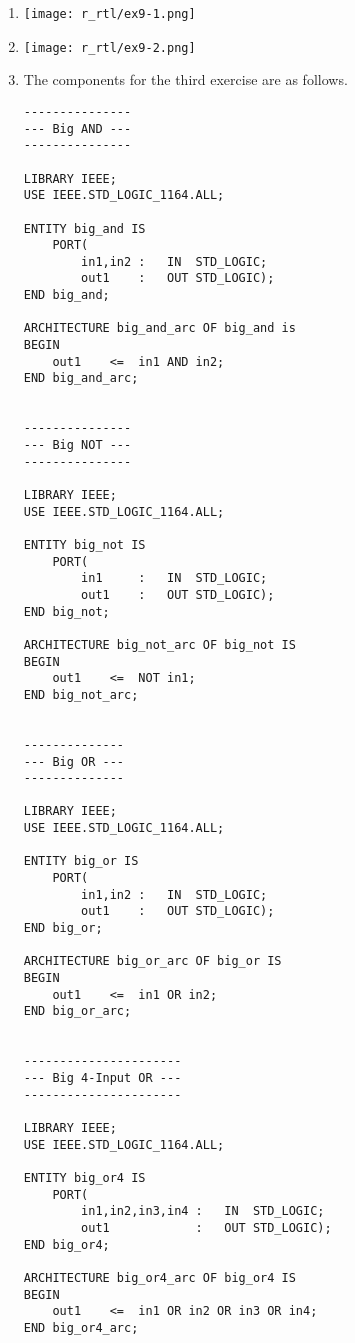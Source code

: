 \begin{enumerate}
	\item
	\begin{minipage}[t]{1\linewidth}
		\vspace{0pt}\raggedright
		\centering
		\texttt{[image: r\_rtl/ex9-1.png]}
	\end{minipage}

\item
\begin{minipage}[t]{1\linewidth}
	\vspace{0pt}\raggedright
	\centering
	\texttt{[image: r\_rtl/ex9-2.png]}
\end{minipage}
\item The components for the third exercise are as follows.
\begin{lstlisting}
---------------
--- Big AND ---
---------------

LIBRARY IEEE;
USE IEEE.STD_LOGIC_1164.ALL;

ENTITY big_and IS
	PORT(
		in1,in2	:	IN	STD_LOGIC;
		out1	:	OUT	STD_LOGIC);
END big_and;

ARCHITECTURE big_and_arc OF big_and is
BEGIN
	out1	<=	in1 AND in2;
END big_and_arc;


---------------
--- Big NOT ---
---------------

LIBRARY IEEE;
USE IEEE.STD_LOGIC_1164.ALL;

ENTITY big_not IS
	PORT(
		in1		:	IN	STD_LOGIC;
		out1	:	OUT	STD_LOGIC);
END big_not;

ARCHITECTURE big_not_arc OF big_not IS
BEGIN
	out1	<=	NOT in1;
END big_not_arc;


--------------
--- Big OR ---
--------------

LIBRARY IEEE;
USE IEEE.STD_LOGIC_1164.ALL;

ENTITY big_or IS
	PORT(
		in1,in2	:	IN	STD_LOGIC;
		out1	:	OUT	STD_LOGIC);
END big_or;

ARCHITECTURE big_or_arc OF big_or IS
BEGIN
	out1	<=	in1 OR in2;
END big_or_arc;


----------------------
--- Big 4-Input OR ---
----------------------

LIBRARY IEEE;
USE IEEE.STD_LOGIC_1164.ALL;

ENTITY big_or4 IS
	PORT(
		in1,in2,in3,in4	:	IN	STD_LOGIC;
		out1			:	OUT	STD_LOGIC);
END big_or4;

ARCHITECTURE big_or4_arc OF big_or4 IS
BEGIN
	out1	<=	in1 OR in2 OR in3 OR in4;
END big_or4_arc;



\end{lstlisting}
\end{enumerate}
